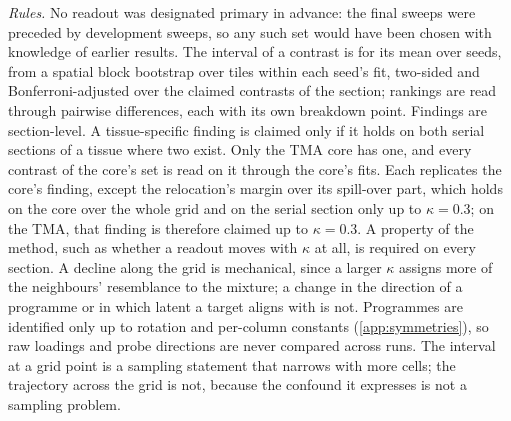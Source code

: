 \emph{Rules.} No readout was designated primary in advance: the final sweeps were preceded by development sweeps, so any such set would have been chosen with knowledge of earlier results. The interval of a contrast is for its mean over seeds, from a spatial block bootstrap over tiles within each seed's fit, two-sided and Bonferroni-adjusted over the claimed contrasts of the section; rankings are read through pairwise differences, each with its own breakdown point. Findings are section-level. A tissue-specific finding is claimed only if it holds on both serial sections of a tissue where two exist. Only the TMA core has one, and every contrast of the core's set is read on it through the core's fits. Each replicates the core's finding, except the relocation's margin over its spill-over part, which holds on the core over the whole grid and on the serial section only up to $\kappa = 0.3$; on the TMA, that finding is therefore claimed up to $\kappa = 0.3$. A property of the method, such as whether a readout moves with $\kappa$ at all, is required on every section. A decline along the grid is mechanical, since a larger $\kappa$ assigns more of the neighbours' resemblance to the mixture; a change in the direction of a programme or in which latent a target aligns with is not. Programmes are identified only up to rotation and per-column constants (\cref{app:symmetries}), so raw loadings and probe directions are never compared across runs. The interval at a grid point is a sampling statement that narrows with more cells; the trajectory across the grid is not, because the confound it expresses is not a sampling problem.

